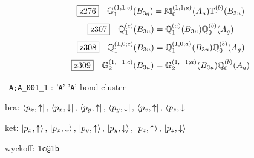 \documentclass[fleqn,10pt,landscape]{jsarticle}
\begin{document}
\begin{dmath*}
\hspace*{3mm}\fbox{z276}\quad \mathbb{G}_{1}^{(1,1;c)}(B_{3g})=\mathbb{M}_{0}^{(1,1;a)}(A_{u}) \mathbb{T}_{1}^{(b)}(B_{3u})
\end{dmath*}
\begin{dmath*}
\hspace*{3mm}\fbox{z307}\quad \mathbb{Q}_{1}^{(c)}(B_{3u})=\mathbb{Q}_{1}^{(a)}(B_{3u}) \mathbb{Q}_{0}^{(b)}(A_{g})
\end{dmath*}
\begin{dmath*}
\hspace*{3mm}\fbox{z308}\quad \mathbb{Q}_{1}^{(1,0;c)}(B_{3u})=\mathbb{Q}_{1}^{(1,0;a)}(B_{3u}) \mathbb{Q}_{0}^{(b)}(A_{g})
\end{dmath*}
\begin{dmath*}
\hspace*{3mm}\fbox{z309}\quad \mathbb{G}_{2}^{(1,-1;c)}(B_{3u})=\mathbb{G}_{2}^{(1,-1;a)}(B_{3u}) \mathbb{Q}_{0}^{(b)}(A_{g})
\end{dmath*}
\vspace{5mm}

\noindent\textbullet\, \texttt{A;A_001_1} : '\texttt{A}'-'\texttt{A}' bond-cluster

\noindent\quad * bra: $\bra{p_{x},\uparrow},\, \bra{p_{x},\downarrow},\, \bra{p_{y},\uparrow},\, \bra{p_{y},\downarrow},\, \bra{p_{z},\uparrow},\, \bra{p_{z},\downarrow}$

\noindent\quad * ket: $\ket{p_{x},\uparrow},\, \ket{p_{x},\downarrow},\, \ket{p_{y},\uparrow},\, \ket{p_{y},\downarrow},\, \ket{p_{z},\uparrow},\, \ket{p_{z},\downarrow}$

\noindent\quad * wyckoff: \texttt{1c@1b}
\end{document}
